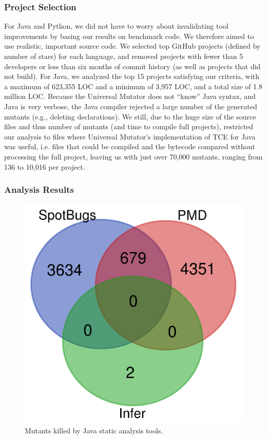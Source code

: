 \subsubsection{Project Selection}

For Java and Python, we did not have to worry about invalidating tool improvements by basing our results on benchmark code.  We therefore aimed to use realistic, important source code.  We selected top GitHub projects (defined by number of stars) for each language, and removed projects with fewer than 5 developers or less than six months of commit history (as well as projects that did not build).  For Java, we analyzed the top 15 projects satisfying our criteria, with a maximum of 623,355 LOC and a minimum of 3,957 LOC, and a total size of 1.8 million LOC.  Because the Universal Mutator does not ``know'' Java syntax, and Java is very verbose, the Java compiler rejected a large number of the generated mutants (e.g., deleting declarations).  We still, due to the huge size of the source files and thus number of mutants (and time to compile full projects), restricted our analysis to files where Universal Mutator's implementation of TCE \cite{TCE} for Java was useful, i.e. files that could be compiled and the bytecode compared without processing the full project, leaving us with just over 70,000 mutants, ranging from 136 to 10,016 per project.

\subsubsection{Analysis Results}


\begin{figure}
  \includegraphics[width=0.6\columnwidth]{java.png}
  \caption{Mutants killed by Java static analysis tools.}
  \label{fig:javavenn}
\end{figure}


